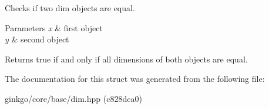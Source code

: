 Checks if two dim objects are equal. 


\begin{DoxyParams}{Parameters}
{\em x} & first object \\
\hline
{\em y} & second object\\
\hline
\end{DoxyParams}
\begin{DoxyReturn}{Returns}
true if and only if all dimensions of both objects are equal. 
\end{DoxyReturn}


The documentation for this struct was generated from the following file\+:\begin{DoxyCompactItemize}
\item 
ginkgo/core/base/dim.\+hpp (c828dca0)\end{DoxyCompactItemize}
